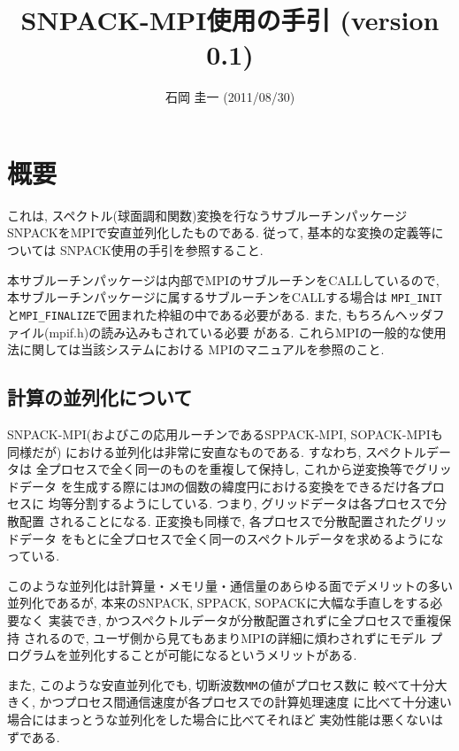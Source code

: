 \documentclass[a4j,fleqn]{jarticle}
\title{SNPACK-MPI使用の手引 (version 0.1)}
\author{石岡 圭一  (2011/08/30)}
\date{}
\begin{document}
\maketitle

\section{概要}

これは, スペクトル(球面調和関数)変換を行なうサブルーチンパッケージ
SNPACKをMPIで安直並列化したものである.
従って, 基本的な変換の定義等については
SNPACK使用の手引を参照すること.

本サブルーチンパッケージは内部でMPIのサブルーチンをCALLしているので,
本サブルーチンパッケージに属するサブルーチンをCALLする場合は
{\tt MPI\_INIT}と{\tt MPI\_FINALIZE}で囲まれた枠組の中である必要がある.
また, もちろんヘッダファイル(mpif.h)の読み込みもされている必要
がある. これらMPIの一般的な使用法に関しては当該システムにおける
MPIのマニュアルを参照のこと.

\subsection{計算の並列化について}

SNPACK-MPI(およびこの応用ルーチンであるSPPACK-MPI, SOPACK-MPIも同様だが)
における並列化は非常に安直なものである. すなわち, スペクトルデータは
全プロセスで全く同一のものを重複して保持し, これから逆変換等でグリッドデータ
を生成する際には{\tt JM}の個数の緯度円における変換をできるだけ各プロセスに
均等分割するようにしている. つまり, グリッドデータは各プロセスで分散配置
されることになる. 正変換も同様で, 各プロセスで分散配置されたグリッドデータ
をもとに全プロセスで全く同一のスペクトルデータを求めるようになっている.

このような並列化は計算量・メモリ量・通信量のあらゆる面でデメリットの多い
並列化であるが, 本来のSNPACK, SPPACK, SOPACKに大幅な手直しをする必要なく
実装でき, かつスペクトルデータが分散配置されずに全プロセスで重複保持
されるので, ユーザ側から見てもあまりMPIの詳細に煩わされずにモデル
プログラムを並列化することが可能になるというメリットがある.

また, このような安直並列化でも, 切断波数{\tt MM}の値がプロセス数に
較べて十分大きく, かつプロセス間通信速度が各プロセスでの計算処理速度
に比べて十分速い場合にはまっとうな並列化をした場合に比べてそれほど
実効性能は悪くないはずである.


\end{document}
